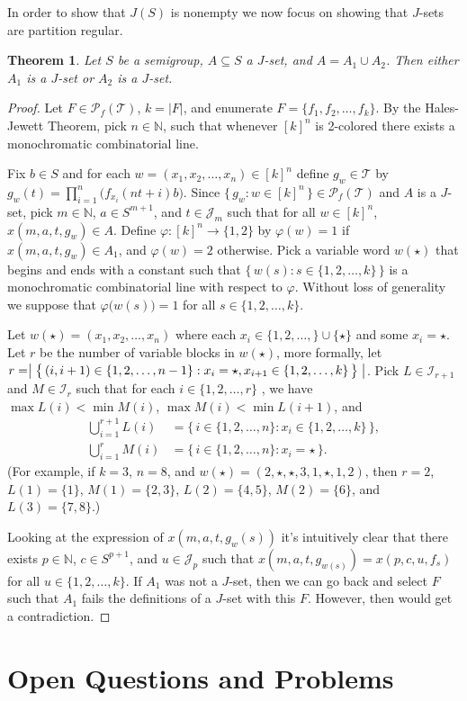 \documentclass[12pt]{article}
\theoremstyle{plain}
\newtheorem{thm}{Theorem}[section]
\theoremstyle{definition}
\newcommand{\bbN}{\mathbb{N}}
\newcommand{\calI}{\mathcal{I}}
\newcommand{\calJ}{\mathcal{J}}
\newcommand{\calT}{\mathcal{T}}
\newcommand{\Pf}{\mathcal{P}_f}
\begin{document}
In order to show that $J(S)$ is nonempty we now focus on showing that
$J$-sets are partition regular. 

\begin{thm}
  Let $S$ be a semigroup, $A \subseteq S$ a $J$-set, and $A = A_1 \cup
  A_2$. 
  Then either $A_1$ is a $J$-set or $A_2$ is a $J$-set. 
\end{thm}
\begin{proof}
  Let $F \in \Pf(\calT)$, $k = |F|$, and enumerate $F = \{ f_1, f_2,
  \ldots, f_k \}$. 
  By the Hales-Jewett Theorem, pick $n \in \bbN$, such that whenever
  $[k]^n$ is 2-colored there exists a monochromatic combinatorial
  line.
  
  Fix $b \in S$ and for each $w = (x_1, x_2, \ldots, x_n) \in [k]^n$
  define $g_w \in \calT$ by $g_w(t) = \prod_{i=1}^n
  \bigr(f_{x_i}(nt+i)b\bigr)$.
  Since $\{\, g_w : w \in [k]^n \,\} \in \Pf(\calT)$ and $A$ is a
  $J$-set, pick $m \in \bbN$, $a \in S^{m+1}$, and $t \in \calJ_m$
  such that for all $w \in [k]^n$, $x(m, a, t, g_w) \in A$.
  Define $\varphi \colon [k]^n \to \{1, 2\}$ by $\varphi(w) = 1 $ if
  $x(m, a, t, g_w) \in A_1$, and $\varphi(w) = 2$ otherwise.
  Pick a variable word $w(\star)$ that begins and ends with a constant
  such that $\bigl\{\, w(s) : s \in
  \{1, 2, \ldots, k\} \,\bigr\}$ is a monochromatic combinatorial line
  with respect to $\varphi$.
  Without loss of generality we suppose that $\varphi\bigl(w(s)\bigr)
  = 1$ for all $s \in \{1, 2, \ldots, k\}$. 

  Let $w(\star) = (x_1, x_2, \ldots, x_n)$ where each $x_i \in \{1, 2,
  \ldots, \} \cup \{\star\}$ and some $x_i = \star$. 
  Let $r$ be the number of variable blocks in $w(\star)$, more
  formally, let $r = \bigm|\bigl\{\, (i, i+1) \in \{1, 2, \ldots, n-1\} :
  x_i = \star, x_{i+1} \in \{1, 2, \ldots, k\} \,\bigr\}\bigm|$.
  Pick $L \in \calI_{r+1}$ and $M \in \calI_r$ such that for each $i
  \in \{1, 2, \ldots, r\}$ , we have $\max L(i) < \min M(i)$, $\max
  M(i) < \min L(i+1)$, and 
  \begin{align*}
    \bigcup_{i=1}^{r+1} L(i) &= \bigl\{\, i \in \{1, 2, \ldots, n \} :
    x_i \in \{1, 2, \ldots, k\} \,\bigr\}, \\
    \bigcup_{i=1}^r M(i) &= \bigl\{\, i \in \{1, 2, \ldots, n \} : x_i
    = \star \,\bigr\}.
  \end{align*}
  (For example, if $k = 3$, $n = 8$, and $w(\star) = (2, \star, \star,
  3, 1, \star, 1, 2)$, then $r = 2$, $L(1) = \{1\}$, $M(1) = \{2,
  3\}$, $L(2) = \{4, 5\}$, $M(2) = \{6\}$, and $L(3) = \{7, 8\}$.)
  
  Looking at the expression of $x(m, a, t, g_w(s))$ it's intuitively
  clear that there exists $p \in \bbN$, $c \in S^{p+1}$, and $u \in
  \calJ_p$ such that $x(m, a, t, g_{w(s)}) = x(p, c, u, f_s)$ for all
  $u \in \{1, 2, \ldots, k\}$. 
  If $A_1$ was not a $J$-set, then  we can go back and select $F$ such
  that $A_1$ fails the definitions of a $J$-set with this $F$. 
  However, then would get a contradiction. 
\end{proof}

\section{Open Questions and Problems}




\end{document}
